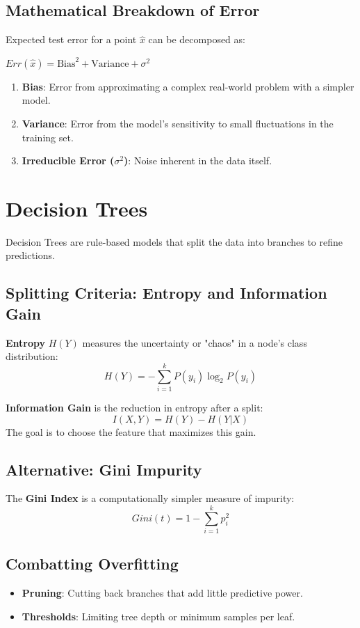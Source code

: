 \documentclass[11pt,fleqn]{book}
\begin{document}
\section{Mathematical Breakdown of Error}
Expected test error for a point $\hat{x}$ can be decomposed as:
\begin{center}
    \Large{\textbf{\color{accent-primary} $Err(\hat{x}) = \text{Bias}^2 + \text{Variance} + \sigma^2$}}
\end{center}
\begin{enumerate}
    \item \textbf{Bias}: Error from approximating a complex real-world problem with a simpler model.
    \item \textbf{Variance}: Error from the model's sensitivity to small fluctuations in the training set.
    \item \textbf{Irreducible Error ($\sigma^2$)}: Noise inherent in the data itself.
\end{enumerate}

\chapter{Decision Trees}

Decision Trees are rule-based models that split the data into branches to refine predictions.

\section{Splitting Criteria: Entropy and Information Gain}
\textbf{Entropy} $H(Y)$ measures the uncertainty or "chaos" in a node's class distribution:
\[H(Y) = -\sum_{i=1}^{k} P(y_i) \log_2 P(y_i)\]

\textbf{Information Gain} is the reduction in entropy after a split:
\[I(X, Y) = H(Y) - H(Y|X)\]
The goal is to choose the feature that maximizes this gain.

\section{Alternative: Gini Impurity}
The \textbf{Gini Index} is a computationally simpler measure of impurity:
\[Gini(t) = 1 - \sum_{i=1}^{k} p_i^2\]

\section{Combatting Overfitting}
\begin{itemize}
    \item \textbf{Pruning}: Cutting back branches that add little predictive power.
    \item \textbf{Thresholds}: Limiting tree depth or minimum samples per leaf.
\end{itemize}
\end{document}
